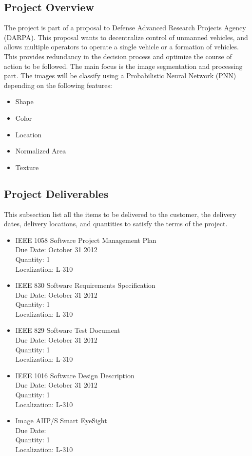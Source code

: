 \documentclass[12pt]{article}
\begin{document}
\subsection{Project Overview}
  The project is part of a proposal to Defense Advanced Research Projects Agency (DARPA). This proposal wants to decentralize control of unmanned vehicles, and allows multiple operators to operate a single vehicle or a formation of vehicles. This provides redundancy in the decision process and optimize the course of action to be followed. The main focus is the image segmentation and processing part. The images will be classify using a Probabilistic Neural Network (PNN) depending on the following features:
  \begin{itemize}
    \item Shape
    \item Color
    \item Location
    \item Normalized Area
    \item Texture
  \end{itemize}

\subsection{Project Deliverables}
This subsection list all the items to be delivered to the customer, the delivery dates, delivery locations, and quantities to satisfy the terms of the project.
\begin{itemize}
  \item IEEE 1058 Software Project Management Plan\\
            Due Date: October 31 2012 \\
            Quantity: 1\\
            Localization: L-310
  \item IEEE 830 Software Requirements Specification\\
            Due Date: October 31 2012\\
            Quantity: 1\\
            Localization: L-310
  \item IEEE 829 Software Test Document \\
            Due Date: October 31 2012\\
            Quantity: 1\\
            Localization: L-310

  \item IEEE 1016 Software Design Description\\
            Due Date: October 31 2012\\
            Quantity: 1\\
            Localization: L-310

  \item Image AIIP/S Smart EyeSight\\
            Due Date:\\
            Quantity: 1\\
            Localization: L-310
\end{itemize}
\end{document}
